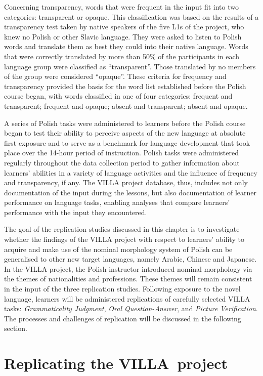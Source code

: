 \documentclass[output=paper,colorlinks,citecolor=brown,modfonts,nonflat]{../langscibook}
\begin{document}
Concerning transparency, words that were frequent in the input fit into two categories: transparent or opaque. This classification was based on the results of a transparency test taken by native speakers of the five L1s of the project, who knew no Polish or other Slavic language. They were asked to listen to Polish words and translate them as best they could into their native language. Words that were correctly translated by more than 50\% of the participants in each language group were classified as “transparent”. Those translated by no members of the group were considered “opaque”. These criteria for frequency and transparency provided the basis for the word list established before the Polish course began, with words classified in one of four categories: frequent and transparent; frequent and opaque; absent and transparent; absent and opaque.

A series of Polish tasks were administered to learners before the Polish course began to test their ability to perceive aspects of the new language at absolute first exposure and to serve as a benchmark for language development that took place over the 14-hour period of instruction. Polish tasks were administered regularly throughout the data collection period to gather information about learners’ abilities in a variety of language activities and the influence of frequency and transparency, if any. The VILLA project database, thus, includes not only documentation of the input during the lessons, but also documentation of learner performance on language tasks, enabling analyses that compare learners’ performance with the input they encountered.

The goal of the replication studies discussed in this chapter is to investigate whether the findings of the VILLA project with respect to learners’ ability to acquire and make use of the nominal morphology system of Polish can be generalised to other new target languages, namely Arabic, Chinese and Japanese. In the VILLA project, the Polish instructor introduced nominal morphology via the themes of nationalities and professions. These themes will remain consistent in the input of the three replication studies. Following exposure to the novel language, learners will be administered replications of carefully selected VILLA tasks: \textit{Grammaticality Judgment}, \textit{Oral Question-Answer}, and \textit{Picture Verification}. The processes and challenges of replication will be discussed in the following section.

\section{Replicating the VILLA~project}\label{sec:watorek:4}
\end{document}
